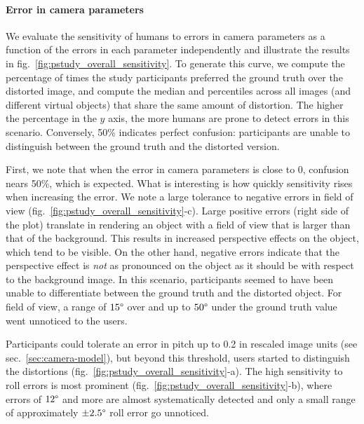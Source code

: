 \paragraph{Error in camera parameters} We evaluate the sensitivity of humans to errors in camera parameters as a function of the errors in each parameter independently and illustrate the results in fig.~\ref{fig:pstudy_overall_sensitivity}. To generate this curve, we compute the percentage of times the study participants preferred the ground truth over the distorted image, and compute the median and percentiles across all images (and different virtual objects) that share the same amount of distortion. The higher the percentage in the $y$ axis, the more humans are prone to detect errors in this scenario. Conversely, 50\% indicates perfect confusion: participants are unable to distinguish between the ground truth and the distorted version. 

First, we note that when the error in camera parameters is close to 0, confusion nears 50\%, which is expected. What is interesting is how quickly sensitivity rises when increasing the error. We note a large tolerance to negative errors in field of view (fig.~\ref{fig:pstudy_overall_sensitivity}-c). Large positive errors (right side of the plot) translate in rendering an object with a field of view that is larger than that of the background. This results in increased perspective effects on the object, which tend to be visible. On the other hand, negative errors indicate that the perspective effect is \emph{not} as pronounced on the object as it should be with respect to the background image. In this scenario, participants seemed to have been unable to differentiate between the ground truth and the distorted object. For field of view, a range of $15\degree$ over and up to $50\degree$ under the ground truth value went unnoticed to the users.

Participants could tolerate an error in pitch up to 0.2 in rescaled image units (see sec.~\ref{sec:camera-model}), but beyond this threshold, users started to distinguish the distortions (fig.~\ref{fig:pstudy_overall_sensitivity}-a). The high sensitivity to roll errors is most prominent (fig.~\ref{fig:pstudy_overall_sensitivity}-b), where errors of $12\degree$ and more are almost systematically detected and only a small range of approximately $\pm2.5\degree$ roll error go unnoticed.


